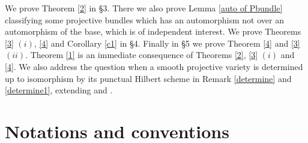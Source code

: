 \documentclass[12pt,reqno]{amsart}
\theoremstyle{definition}
\numberwithin{equation}{section}
\begin{document}
We prove Theorem \ref{2} in \S 3. There we also prove Lemma \ref{auto of Pbundle} classifying some projective bundles which has an automorphism not over an automorphism of the base, which is of independent interest. We prove Theorems \ref{3} $(i)$, \ref{4} and Corollary \ref{c1} in \S 4. Finally in \S 5 we prove Theorem \ref{4} and \ref {3} $(ii)$. Theorem \ref{1} is an immediate consequence of Theorems \ref{2}, \ref{3}  $(i)$ and \ref{4}. We also address the question when a smooth projective variety is determined up to isomorphism by its punctual Hilbert scheme in Remark \ref{determine} and \ref{determine1}, extending {\cite[Corollary 5]{belmans2020automorphisms}} and {\cite[Theorem 1.4]{Ha}}.
\section{Notations and conventions}
\end{document}
